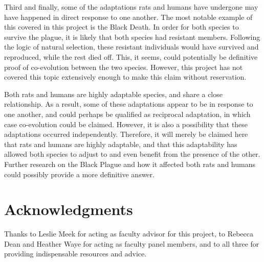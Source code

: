 \documentclass[12pt]{article}
\begin{document}
Third and finally, some of the adaptations rats and humans have undergone may have happened in direct response to one another. The most notable example of this covered in this project is the Black Death. In order for both species to survive the plague, it is likely that both species had resistant members. Following the logic of natural selection, these resistant individuals would have survived and reproduced, while the rest died off. This, it seems, could potentially be definitive proof of co-evolution between the two species. However, this project has not covered this topic extensively enough to make this claim without reservation.

Both rats and humans are highly adaptable species, and share a close relationship. As a result, some of these adaptations appear to be in response to one another, and could perhaps be qualified as reciprocal adaptation, in which case co-evolution could be claimed. However, it is also a possibility that these adaptations occurred independently. Therefore, it will merely be claimed here that rats and humans are highly adaptable, and that this adaptability has allowed both species to adjust to and even benefit from the presence of the other. Further research on the Black Plague and how it affected both rats and humans could possibly provide a more definitive answer.

\section{Acknowledgments}

Thanks to Leslie Meek for acting as faculty advisor for this project, to Rebecca Dean and Heather Waye for acting as faculty panel members, and to all three for providing indispensable resources and advice.

\pagebreak



\end{document}
